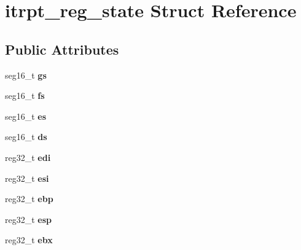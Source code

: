 \hypertarget{structitrpt__reg__state}{}\section{itrpt\+\_\+reg\+\_\+state Struct Reference}
\label{structitrpt__reg__state}
\subsection*{Public Attributes}
\begin{DoxyCompactItemize}
\item 
\mbox{\label{structitrpt__reg__state_a32bb253dd88f2c4206e765c2d03a7ef8}} 
seg16\+\_\+t {\bfseries gs}
\item 
\mbox{\label{structitrpt__reg__state_a554a808ce1321ac8cacc35ef7bc3b3e3}} 
seg16\+\_\+t {\bfseries fs}
\item 
\mbox{\label{structitrpt__reg__state_adb08bdd2a443f79e9dde99765dc5b43e}} 
seg16\+\_\+t {\bfseries es}
\item 
\mbox{\label{structitrpt__reg__state_ab8b1b9f85e20793baf887ce7d191b818}} 
seg16\+\_\+t {\bfseries ds}
\item 
\mbox{\label{structitrpt__reg__state_a6f70ba87bb7534d27dcdcc698942972c}} 
reg32\+\_\+t {\bfseries edi}
\item 
\mbox{\label{structitrpt__reg__state_af0da16f40d815e471873295e4bea673c}} 
reg32\+\_\+t {\bfseries esi}
\item 
\mbox{\label{structitrpt__reg__state_a1a9e45ef035dc3900b72fa89d55d5be5}} 
reg32\+\_\+t {\bfseries ebp}
\item 
\mbox{\label{structitrpt__reg__state_ab0db6e2487c695719c314dafc80ba389}} 
reg32\+\_\+t {\bfseries esp}
\item 
\mbox{\label{structitrpt__reg__state_a541757a482ee8c09a7a81e3a4c37f1e1}} 
reg32\+\_\+t {\bfseries ebx}
\item 

\end{DoxyCompactItemize}
